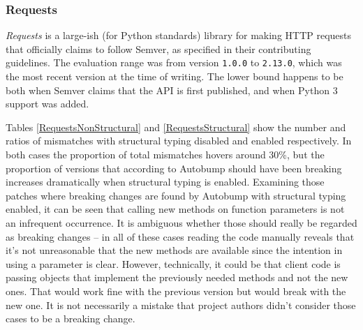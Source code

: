 \documentclass{l4proj}
\newcommand\genericstyle{\lstset{basicstyle=\ttm}}
\newcommand\codeinline[1]{{\genericstyle\lstinline!#1!}}
\begin{document}
\subsubsection{Requests}

\textit{Requests} is a large-ish (for Python standards) library for
making HTTP requests that officially claims to follow Semver, as
specified in their contributing guidelines. The evaluation range was
from version \codeinline{1.0.0} to \codeinline{2.13.0}, which was the
most recent version at the time of writing. The lower bound happens to
be both when Semver claims that the API is first published, and when
Python 3 support was added.

Tables \ref{RequestsNonStructural} and \ref{RequestsStructural} show
the number and ratios of mismatches with structural typing disabled
and enabled respectively. In both cases the proportion of total
mismatches hovers around 30\%, but the proportion of versions that
according to Autobump should have been breaking increases dramatically
when structural typing is enabled. Examining those patches where
breaking changes are found by Autobump with structural typing enabled,
it can be seen that calling new methods on function parameters is not
an infrequent occurrence. It is ambiguous whether those should really
be regarded as breaking changes -- in all of these cases reading the
code manually reveals that it's not unreasonable that the new methods
are available since the intention in using a parameter is clear.
However, technically, it could be that client code is passing objects
that implement the previously needed methods and not the new ones.
That would work fine with the previous version but would break with
the new one. It is not necessarily a mistake that project authors
didn't consider those cases to be a breaking change.
\end{document}
